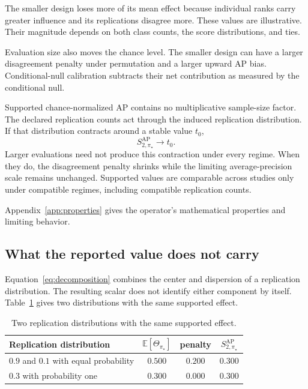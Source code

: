 \documentclass[11pt]{article}
\newcommand{\E}{\mathbb{E}}
\newcommand{\SAP}{S_{2,\pi_\star}^{\mathrm{AP}}}
\theoremstyle{remark}
\begin{document}
The smaller design loses more of its mean effect because individual ranks carry greater influence and its replications disagree more. These values are illustrative. Their magnitude depends on both class counts, the score distributions, and ties.

Evaluation size also moves the chance level. The smaller design can have a larger disagreement penalty under permutation and a larger upward AP bias. Conditional-null calibration subtracts their net contribution as measured by the conditional null.

Supported chance-normalized AP contains no multiplicative sample-size factor. The declared replication counts act through the induced replication distribution. If that distribution contracts around a stable value $t_0$,
\[
\SAP\longrightarrow t_0.
\]
Larger evaluations need not produce this contraction under every regime. When they do, the disagreement penalty shrinks while the limiting average-precision scale remains unchanged. Supported values are comparable across studies only under compatible regimes, including compatible replication counts.

Appendix~\ref{app:properties} gives the operator's mathematical properties and limiting behavior.

\subsection{What the reported value does not carry}
\label{sec:collision}

Equation~\eqref{eq:decomposition} combines the center and dispersion of a replication distribution. The resulting scalar does not identify either component by itself. Table~\ref{tab:collision} gives two distributions with the same supported effect.

\begin{table}[ht]
\centering
\caption{Two replication distributions with the same supported effect.}
\label{tab:collision}
\begin{tabular}{@{}lccc@{}}
\toprule
Replication distribution & $\E[\Theta_{\pi_\star}]$ & penalty & $\SAP$ \\
\midrule
$0.9$ and $0.1$ with equal probability & $0.500$ & $0.200$ & $0.300$ \\
$0.3$ with probability one & $0.300$ & $0.000$ & $0.300$ \\
\bottomrule
\end{tabular}
\end{table}
\end{document}
